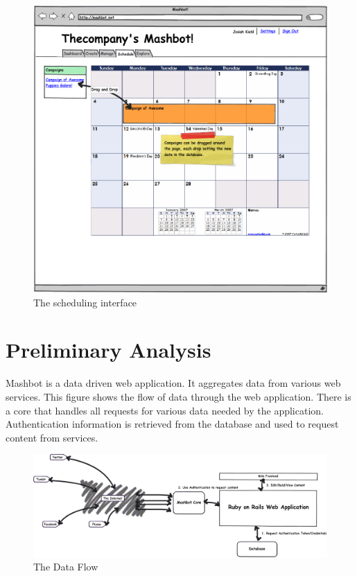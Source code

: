 \documentclass{article}
\begin{document}
\clearpage
\begin{figure}
\centering
\includegraphics[scale=0.35]{../mockups/schedule.png}
\caption{The scheduling interface}
\label{schedule}
\end{figure}
\clearpage
\section{Preliminary Analysis} %
Mashbot is a data driven web application.  It aggregates data from
various web services.  This figure shows the flow of data through the
web application.  There is a core that handles all requests for
various data needed by the application.  Authentication information is
retrieved from the database and used to request content from services.

\begin{figure}
\centering
\includegraphics[scale=0.3]{../mockups/dataflow.png}
\caption{The Data Flow}
\end{figure}
\begin{figure}
\label{dataflow}
\end{figure}
\end{document}
